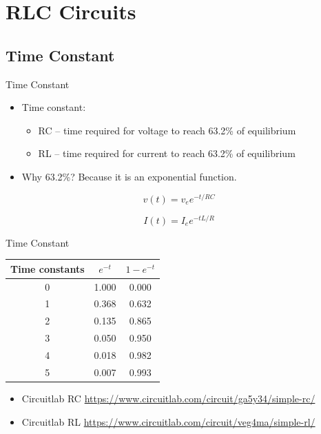 \documentclass{beamer}
\begin{document}
\section{RLC Circuits}

\subsection{Time Constant}
\begin{frame}{Time Constant}{}
\begin{itemize}
\item Time constant: 
\begin{itemize}
\item RC – time required for voltage to reach 63.2\% of equilibrium
\item RL – time required for current to reach 63.2\% of equilibrium
\end{itemize}
\item Why 63.2\%?  Because it is an exponential function.
\end{itemize}
\parbox{0.48\textwidth}{

\[v(t)=v_e e^{-t/RC}\]
}
\parbox{0.48\textwidth}{

\[I(t)=I_e e^{-tL/R}\]
}
\end{frame}

\begin{frame}{Time Constant}{}
\begin{tabular}{ccc}
Time constants & $e^{-t}$ & $1-e^{-t}$ \\
\hline  
0&	1.000&	0.000\\
1&	0.368&	0.632\\
2&	0.135&	0.865\\
3&	0.050&	0.950\\
4&	0.018&	0.982\\
5&	0.007&	0.993\\
\hline
\end{tabular}

\begin{itemize}
\item Circuitlab RC \url{https://www.circuitlab.com/circuit/ga5y34/simple-rc/}
\item Circuitlab RL \url{https://www.circuitlab.com/circuit/veg4ma/simple-rl/}
\end{itemize}
\end{frame}
\end{document}
